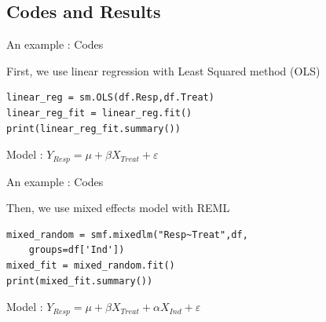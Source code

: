 \documentclass[unknownkeysallowed]{beamer}
\begin{document}
\subsection{Codes and Results}
\label{sub:Codes and Results}


\begin{frame}[fragile]{An example : Codes}

First, we use linear regression with Least Squared method (OLS)
\begin{lstlisting}
linear_reg = sm.OLS(df.Resp,df.Treat)
linear_reg_fit = linear_reg.fit()
print(linear_reg_fit.summary())
\end{lstlisting}
\vspace{1cm}
Model : $Y_{Resp} = \mu+\beta X_{Treat} + \varepsilon$
\end{frame}

\begin{frame}[fragile]{An example : Codes}

Then, we use mixed effects model with REML
\begin{lstlisting}
mixed_random = smf.mixedlm("Resp~Treat",df,
    groups=df['Ind'])
mixed_fit = mixed_random.fit()
print(mixed_fit.summary())
\end{lstlisting}
\vspace{1cm}
Model : $Y_{Resp} = \mu+\beta X_{Treat} + \alpha X_{Ind} + \varepsilon$
\end{frame}
\end{document}
